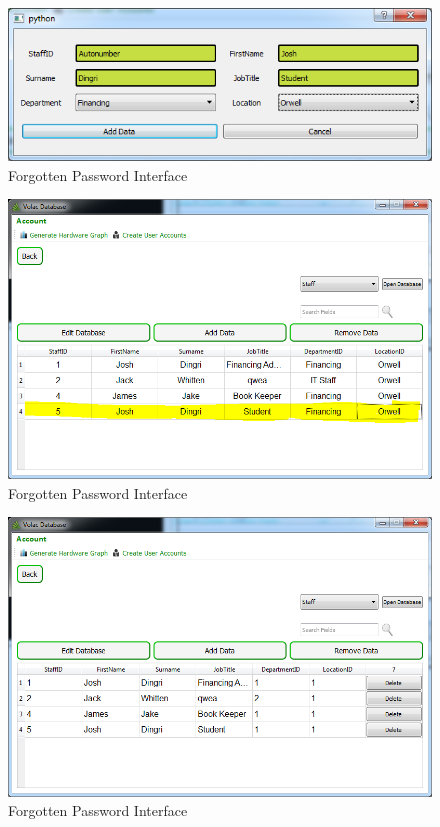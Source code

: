 \begin{figure}[H]
    \includegraphics[width=\textwidth]{./Testing/Images/AddDataDataExample.png}
    \caption{Forgotten Password Interface} \label{fig:AddDataDataExample}
\end{figure}

\begin{figure}[H]
    \includegraphics[width=\textwidth]{./Testing/Images/AddedData.png}
    \caption{Forgotten Password Interface} \label{fig:AddedData}
\end{figure}

\begin{figure}[H]
    \includegraphics[width=\textwidth]{./Testing/Images/RemoveDataButtons.png}
    \caption{Forgotten Password Interface} \label{fig:RemoveDataButtons}
\end{figure}


